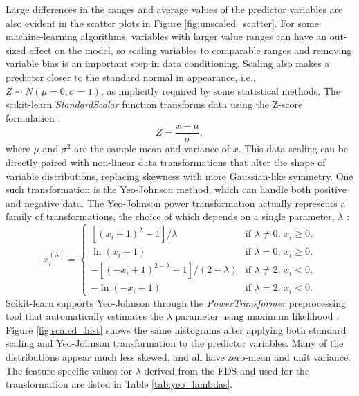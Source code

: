 Large differences in the ranges and average values of the predictor variables are also evident in the scatter plots in Figure \ref{fig:unscaled_scatter}. For some machine-learning algorithms, variables with larger value ranges can have an out-sized effect on the model, so scaling variables to comparable ranges and removing variable bias is an important step in data conditioning. Scaling also makes a predictor closer to the standard normal in appearance, i.e., $Z\sim N(\mu=0, \sigma=1)$, as implicitly required by some statistical methods. The scikit-learn \textit{StandardScalar} function transforms data using the Z-score formulation \citep{scikit-learn_sklearnpreprocessingstandardscaler_2021}:
\begin{equation}
    Z = \frac{x - \mu}{\sigma},
\end{equation}
where $\mu$ and $\sigma^2$ are the sample mean and variance of $x$.
This data scaling can be directly paired with non-linear data transformations that alter the shape of variable distributions, replacing skewness with more Gaussian-like symmetry. One such transformation is the Yeo-Johnson method, which can handle both positive and negative data. The Yeo-Johnson power transformation actually represents a family of transformations, the choice of which depends on a single parameter, $\lambda$ \citep{yeo_new_2000}:
\begin{equation}
    x_i^{(\lambda)} = 
    \begin{cases}
      [(x_i + 1)^{\lambda}-1]/\lambda & \text{if $\lambda \neq 0$, $x_i \geq 0$,}\\
      \ln{(x_i + 1)} & \text{if $\lambda = 0$, $x_i \geq 0$,}\\
      -[(-x_i + 1)^{2-\lambda}-1]/(2-\lambda) & \text{if $\lambda \neq 2$, $x_i < 0$,}\\
      -\ln{(-x_i + 1)} & \text{if $\lambda = 2$, $x_i < 0$}.
    \end{cases}  
\end{equation}
Scikit-learn supports Yeo-Johnson through the \textit{PowerTransformer} preprocessing tool that automatically estimates the $\lambda$ parameter using maximum likelihood \citep{scikit-learn_sklearnpreprocessingpowertransformer_2021}. Figure \ref{fig:scaled_hist} shows the same histograms after applying both standard scaling and Yeo-Johnson transformation to the predictor variables. Many of the distributions appear much less skewed, and all have zero-mean and unit variance. The feature-specific values for $\lambda$ derived from the FDS and used for the transformation are listed in Table \ref{tab:yeo_lambdas}. 


